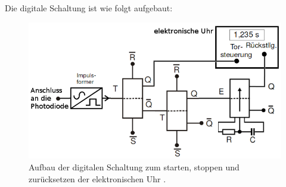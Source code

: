      Die digitale Schaltung ist wie folgt aufgebaut:
      \begin{figure}[H]
               \centering
               \includegraphics[width=\linewidth-150pt,height=\textheight-150pt,keepaspectratio]{content/Bilder/Digimist.png}
               \caption{Aufbau der digitalen Schaltung zum starten, stoppen und zurücksetzen der elektronischen Uhr \cite{V102}.}
               \label{fig:digimist}
             \end{figure}
